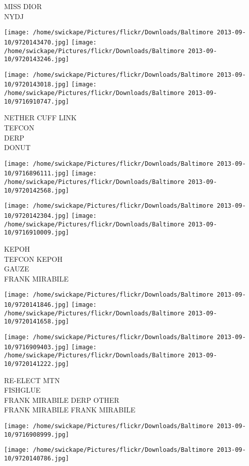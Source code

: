 \documentclass[10pt,letterpaper]{article}
\begin{document}
MISS DIOR\\
NYDJ
\pagebreak

\texttt{[image: /home/swickape/Pictures/flickr/Downloads/Baltimore 2013-09-10/9720143470.jpg]}
\texttt{[image: /home/swickape/Pictures/flickr/Downloads/Baltimore 2013-09-10/9720143246.jpg]}

\texttt{[image: /home/swickape/Pictures/flickr/Downloads/Baltimore 2013-09-10/9720143018.jpg]}
\texttt{[image: /home/swickape/Pictures/flickr/Downloads/Baltimore 2013-09-10/9716910747.jpg]}

NETHER CUFF LINK\\
TEFCON\\
DERP\\
DONUT
\pagebreak

\texttt{[image: /home/swickape/Pictures/flickr/Downloads/Baltimore 2013-09-10/9716896111.jpg]}
\texttt{[image: /home/swickape/Pictures/flickr/Downloads/Baltimore 2013-09-10/9720142568.jpg]}

\texttt{[image: /home/swickape/Pictures/flickr/Downloads/Baltimore 2013-09-10/9720142304.jpg]}
\texttt{[image: /home/swickape/Pictures/flickr/Downloads/Baltimore 2013-09-10/9716910009.jpg]}

KEPOH\\
TEFCON KEPOH\\
GAUZE\\
FRANK MIRABILE
\pagebreak

\texttt{[image: /home/swickape/Pictures/flickr/Downloads/Baltimore 2013-09-10/9720141846.jpg]}
\texttt{[image: /home/swickape/Pictures/flickr/Downloads/Baltimore 2013-09-10/9720141658.jpg]}

\texttt{[image: /home/swickape/Pictures/flickr/Downloads/Baltimore 2013-09-10/9716909403.jpg]}
\texttt{[image: /home/swickape/Pictures/flickr/Downloads/Baltimore 2013-09-10/9720141222.jpg]}

RE{-}ELECT MTN\\
FISHGLUE\\
FRANK MIRABILE DERP OTHER\\
FRANK MIRABILE FRANK MIRABILE
\pagebreak

\texttt{[image: /home/swickape/Pictures/flickr/Downloads/Baltimore 2013-09-10/9716908999.jpg]}

\vspace{0.25in}
\texttt{[image: /home/swickape/Pictures/flickr/Downloads/Baltimore 2013-09-10/9720140786.jpg]}
\end{document}
